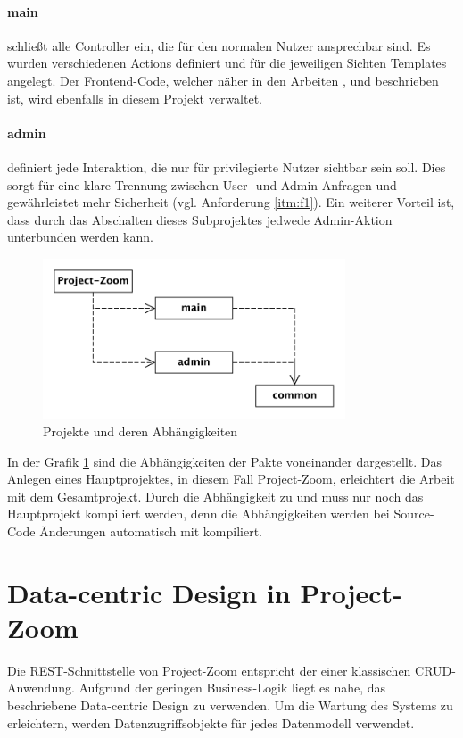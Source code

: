 \paragraph{main} schließt alle Controller ein, die für den normalen Nutzer ansprechbar sind. Es wurden verschiedenen Actions definiert und für die jeweiligen Sichten Templates angelegt. Der Frontend-Code, welcher näher in den Arbeiten \cite{bp-norman}, \cite{bp-tomh} und \cite{bp-anita} beschrieben ist, wird ebenfalls in diesem Projekt verwaltet.

\paragraph{admin} definiert jede Interaktion, die nur 
für privilegierte Nutzer sichtbar sein soll. Dies sorgt für eine klare Trennung zwischen User- und Admin-Anfragen und gewährleistet mehr Sicherheit (vgl. Anforderung \ref{itm:f1}). Ein weiterer Vorteil ist, dass durch das Abschalten dieses Subprojektes jedwede Admin-Aktion unterbunden werden kann.

\begin{figure}[h]  
  \centering     
  \includegraphics[width=0.8\textwidth]{img/projekte.pdf}  
   \caption{Projekte und deren Abhängigkeiten}   
  \label{fig:projects} 
\end{figure}

\FloatBarrier
In der Grafik \ref{fig:projects} sind die Abhängigkeiten der Pakte voneinander dargestellt. Das Anlegen eines Hauptprojektes, in diesem Fall Project-Zoom, erleichtert die Arbeit mit dem Gesamtprojekt. Durch die Abhängigkeit zu  und  muss nur noch das Hauptprojekt kompiliert werden, denn die Abhängigkeiten werden bei Source-Code Änderungen automatisch mit kompiliert.

\section{Data-centric Design in Project-Zoom}
\label{sec:umsetzung_dcd}
Die REST-Schnittstelle von Project-Zoom entspricht der einer klassischen CRUD-Anwendung. Aufgrund der geringen Business-Logik liegt es nahe, das beschriebene Data-centric Design zu verwenden. Um die Wartung des Systems zu erleichtern, werden Datenzugriffsobjekte für jedes Datenmodell verwendet.

